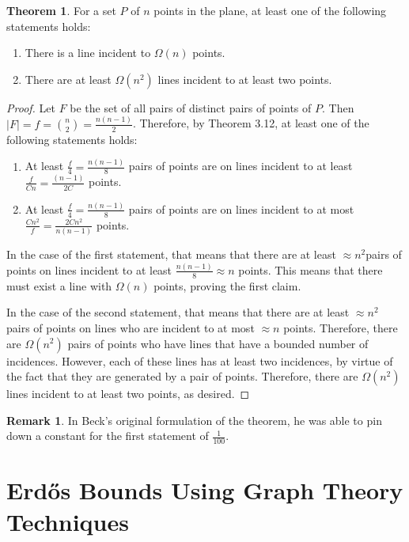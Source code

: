 \documentclass{scrippsthesisclass}
\theoremstyle{definition}
\newtheorem{theorem}{Theorem}[section]
\newtheorem*{remark}{Remark}
\begin{document}
\begin{theorem}
    For a set $P$ of $n$ points in the plane, at least one of the following statements holds:
    \begin{enumerate}
        \item There is a line incident to $\Omega(n)$ points.
        \item There are at least $\Omega(n^2)$ lines incident to at least two points. 
    \end{enumerate}
\end{theorem}
\begin{proof}
    Let $F$ be the set of all pairs of distinct pairs of points of $P$. 
    Then $|F| = f = {n \choose 2} = \frac{n(n-1)}{2}$. 
    Therefore, by Theorem 3.12, at least one of the following statements holds:
    \begin{enumerate}
        \item At least $\frac{f}{4} = \frac{n(n-1)}{8}$ pairs of points are on lines incident to at least $\frac{f}{Cn} = \frac{(n-1)}{2C}$ points. 
        \item At least $\frac{f}{4} = \frac{n(n-1)}{8}$ pairs of points are on lines incident to at most $\frac{Cn^2}{f} = \frac{2Cn^2}{n(n-1)}$ points. 
    \end{enumerate}
    In the case of the first statement, that means that there are at least $\approx n^2$pairs of points on lines incident to at least $\frac{n(n-1)}{8} \approx n$ points. 
    This means that there must exist a line with $\Omega(n)$ points, proving the first claim.

    In the case of the second statement, that means that there are at least $\approx n^2$ pairs of points on lines who are incident to at most $\approx n$ points. 
    Therefore, there are $\Omega(n^2)$ pairs of points who have lines that have a bounded number of incidences.
    However, each of these lines has at least two incidences, by virtue of the fact that they are generated by a pair of points. 
    Therefore, there are $\Omega(n^2)$ lines incident to at least two points, as desired.
\end{proof}

\begin{remark}
    In Beck's original formulation of the theorem, he was able to pin down a constant for the first statement of $\frac{1}{100}$. 
\end{remark}

\chapter{Erd\H{o}s Bounds Using Graph Theory Techniques}
\end{document}

